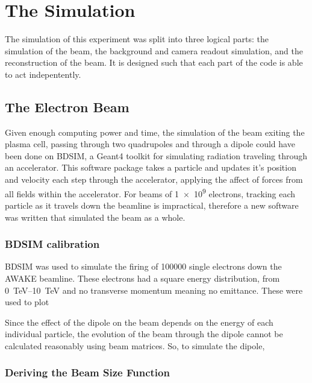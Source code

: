 
\section{The Simulation}

The simulation of this experiment was split into three logical parts: the
simulation of the beam, the background and camera readout simulation, and the
reconstruction of the beam.
It is designed such that each part of the code is able to act indepentently.

\subsection{The Electron Beam}

Given enough computing power and time, the simulation of the beam exiting the
plasma cell, passing through two quadrupoles and through a dipole could have
been done on BDSIM, a Geant4 toolkit for simulating radiation traveling through
an accelerator. This software package takes a particle and updates it's
position and velocity each step through the accelerator, applying the affect of
forces from all fields within the accelerator.  For beams of \num{1e9}
electrons, tracking each particle as it travels down the beamline is
impractical, therefore a new software was written that simulated the beam as
a whole.

\subsubsection{BDSIM calibration}


BDSIM was used to simulate the firing of \num{100 000} single electrons down
the AWAKE beamline. These electrons had a square energy distribution, from
\SIrange{0}{10}{\tera\electronvolt} and no transverse momentum meaning no
emittance. These were used to plot 

Since the effect of the dipole on the beam depends on the energy of each
individual particle, the evolution of the beam through the dipole cannot be
calculated reasonably using beam matrices. So, to simulate the dipole, 

\subsubsection{Deriving the Beam Size Function}


